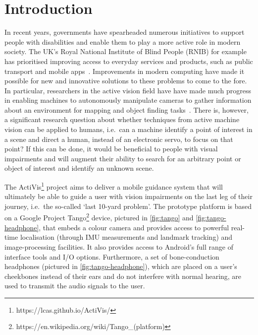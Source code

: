 \documentclass{article}
\begin{document}
\section{Introduction}

In recent years, governments have spearheaded numerous initiatives to support people with disabilities and enable them to play a more active role in modern society.
The UK's Royal National Institute of Blind People (RNIB) for example has prioritised improving access to everyday services and products, such as public transport and mobile apps~\cite{rnib2016uk}.
Improvements in modern computing have made it possible for new and innovative solutions to these problems to come to the fore.
In particular, researchers in the active vision field have have made much progress in enabling machines to autonomously manipulate cameras to gather information about an environment for mapping and object finding tasks~\cite{bajcsy2018revisiting,lock2019active}.
There is, however, a significant research question about whether techniques from active machine vision can be applied to humans, i.e.\ can a machine identify a point of interest in a scene and direct a human, instead of an electronic servo, to focus on that point?
If this can be done, it would be beneficial to people with visual impairments and will augment their ability to search for an arbitrary point or object of interest and identify an unknown scene. 

The ActiVis\footnote{https://lcas.github.io/ActiVis/} project aims to deliver a mobile guidance system that will ultimately be able to guide a user with vision impairments on the last leg of their journey, i.e.\ the so-called `last 10-yard problem'. 
The prototype platform is based on a Google Project Tango\footnote{https://en.wikipedia.org/wiki/Tango\_(platform)} device, pictured in \cref{fig:tango} and \cref{fig:tango-headphone}, that embeds a colour camera and provides access to powerful real-time localisation (through IMU measurements and landmark tracking) and image-processing facilities. 
It also provides access to Android's full range of interface tools and I/O options. 
Furthermore, a set of bone-conduction headphones (pictured in \cref{fig:tango-headphone}), which are placed on a user's cheekbones instead of their ears and do not interfere with normal hearing, are used to transmit the audio signals to the user.
\end{document}
